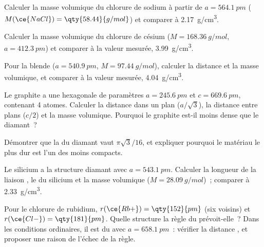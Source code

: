 \begin{exercise}[$\star\star$]\label{exo:b1:crystals-ionic-covalent:6}
Calculer la masse volumique du chlorure de sodium à partir de
$a = \qty{564.1}{pm}$
($M(\ce{NaCl}) = \qty{58.44}{g/mol}$) et comparer à \qty{2.17}{g/cm^3}.
\end{exercise}

\begin{exercise}[$\star\star$]\label{exo:b1:crystals-ionic-covalent:7}
Calculer la masse volumique du chlorure de césium ($M = \qty{168.36}{g/mol}$,
$a = \qty{412.3}{pm}$) et comparer à la valeur mesurée, \qty{3.99}{g/cm^3}.
\end{exercise}

\begin{exercise}[$\star\star$]\label{exo:b1:crystals-ionic-covalent:8}
Pour la blende ($a = \qty{540.9}{pm}$, $M = \qty{97.44}{g/mol}$),
calculer la distance  et la masse volumique, et comparer à la
valeur mesurée, \qty{4.04}{g/cm^3}.
\end{exercise}

\begin{exercise}[$\star\star$]\label{exo:b1:crystals-ionic-covalent:9}
Le graphite a une  hexagonale de paramètres $a = \qty{245.6}{pm}$
et $c = \qty{669.6}{pm}$, contenant 4 atomes. Calculer la distance
 dans un plan ($a/\sqrt3$), la distance entre plans ($c/2$) et
la masse volumique. Pourquoi le graphite est-il moins dense que le
diamant~?
\end{exercise}

\begin{exercise}[$\star\star\star$]\label{exo:b1:crystals-ionic-covalent:10}
Démontrer que la  du diamant vaut $\pi\sqrt3/16$, et expliquer
pourquoi le matériau le plus dur est l'un des moins compacts.
\end{exercise}

\begin{exercise}[$\star\star\star$]\label{exo:b1:crystals-ionic-covalent:11}
Le silicium a la structure diamant avec $a = \qty{543.1}{pm}$. Calculer
la longueur de la liaison , le  du silicium et
la masse volumique ($M = \qty{28.09}{g/mol}$)~; comparer à
\qty{2.33}{g/cm^3}.
\end{exercise}

\begin{exercise}[$\star\star\star$]\label{exo:b1:crystals-ionic-covalent:12}
Pour le chlorure de rubidium, $r(\ce{Rb+}) = \qty{152}{pm}$ (six
voisins) et $r(\ce{Cl-}) = \qty{181}{pm}$. Quelle structure la règle du
 prévoit-elle~? Dans les conditions ordinaires, il est
du  avec $a = \qty{658.1}{pm}$~: vérifier la distance
, et proposer une raison de l'échec de la règle.
\end{exercise}

